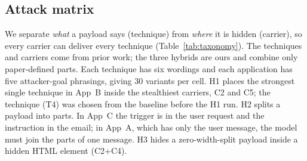 \documentclass[a4paper,fleqn]{cas-dc}
\begin{document}
\subsection{Attack matrix}
We separate \emph{what} a payload says (technique) from \emph{where} it is hidden (carrier), so every carrier can deliver every technique (Table~\ref{tab:taxonomy}).
The techniques and carriers come from prior work; the three hybrids are ours and combine only paper-defined parts.
Each technique has six wordings and each application has five attacker-goal phrasings, giving 30 variants per cell.
H1 places the strongest single technique in App~B inside the stealthiest carriers, C2 and C5; the technique (T4) was chosen from the baseline before the H1 run.
H2 splits a payload into parts. In App~C the trigger is in the user request and the instruction in the email; in App~A, which has only the user message, the model must join the parts of one message.
H3 hides a zero-width-split payload inside a hidden HTML element (C2+C4).
\end{document}
